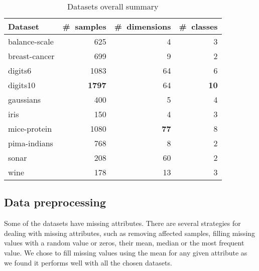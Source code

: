 \documentclass[12pt,a4paper]{report}
\begin{document}
\begin{table}[ht] \centering
\begin{tabular}{lrrr}
\hline
Dataset & \#~samples & \#~dimensions & \#~classes \\
\hline
balance-scale           & 625   & 4    & 3  \\
breast-cancer           & 699   & 9    & 2  \\
digits6                 & 1083  & 64   & 6  \\
digits10                & \textbf{1797}  & 64  & \textbf{10} \\
gaussians               & 400   & 5   & 4  \\
iris                    & 150   & 4    & 3  \\
mice-protein            & 1080  & \textbf{77}   & 8  \\
pima-indians            & 768   & 8    & 2  \\
sonar                   & 208   & 60   & 2  \\
wine                    & 178   & 13   & 3  \\
\hline
\end{tabular}
\caption{Datasets overall summary} \label{tab:datasets}
\end{table}

\subsection{Data preprocessing} \label{chap:exp:preprocessing}
Some of the datasets have missing attributes. There are several strategies for dealing with missing attributes, such as removing affected samples, filling missing values with a random value or zeros, their mean, median or the most frequent value. We chose to fill missing values using the mean for any given attribute as we found it performs well with all the chosen datasets.
\end{document}
